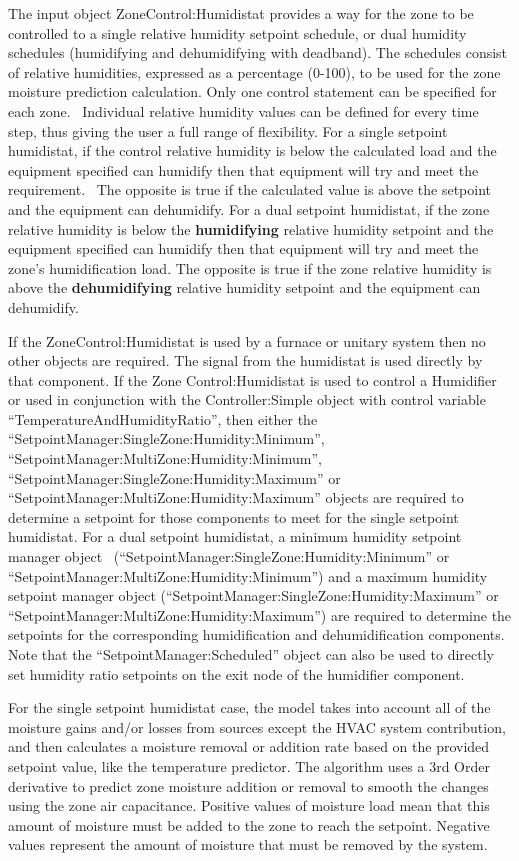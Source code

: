 The input object ZoneControl:Humidistat provides a way for the zone to be controlled to a single relative humidity setpoint schedule, or dual humidity schedules (humidifying and dehumidifying with deadband). The schedules consist of relative humidities, expressed as a percentage (0-100), to be used for the zone moisture prediction calculation. Only one control statement can be specified for each zone.~ Individual relative humidity values can be defined for every time step, thus giving the user a full range of flexibility. For a single setpoint humidistat, if the control relative humidity is below the calculated load and the equipment specified can humidify then that equipment will try and meet the requirement.~ The opposite is true if the calculated value is above the setpoint and the equipment can dehumidify. For a dual setpoint humidistat, if the zone relative humidity is below the \textbf{humidifying} relative humidity setpoint and the equipment specified can humidify then that equipment will try and meet the zone's humidification load. The opposite is true if the zone relative humidity is above the \textbf{dehumidifying} relative humidity setpoint and the equipment can dehumidify.

If the ZoneControl:Humidistat is used by a furnace or unitary system then no other objects are required. The signal from the humidistat is used directly by that component. If the Zone Control:Humidistat is used to control a Humidifier or used in conjunction with the Controller:Simple object with control variable ``TemperatureAndHumidityRatio'', then either the ``SetpointManager:SingleZone:Humidity:Minimum'', ``SetpointManager:MultiZone:Humidity:Minimum'',~~ ``SetpointManager:SingleZone:Humidity:Maximum'' or ``SetpointManager:MultiZone:Humidity:Maximum'' objects are required to determine a setpoint for those components to meet for the single setpoint humidistat. For a dual setpoint humidistat, a minimum humidity setpoint manager object~ (``SetpointManager:SingleZone:Humidity:Minimum'' or ``SetpointManager:MultiZone:Humidity:Minimum'') and a maximum humidity setpoint manager object (``SetpointManager:SingleZone:Humidity:Maximum'' or ``SetpointManager:MultiZone:Humidity:Maximum'') are required to determine the setpoints for the corresponding humidification and dehumidification components. Note that the ``SetpointManager:Scheduled'' object can also be used to directly set humidity ratio setpoints on the exit node of the humidifier component.

For the single setpoint humidistat case, the model takes into account all of the moisture gains and/or losses from sources except the HVAC system contribution, and then calculates a moisture removal or addition rate based on the provided setpoint value, like the temperature predictor. The algorithm uses a 3rd Order derivative to predict zone moisture addition or removal to smooth the changes using the zone air capacitance. Positive values of moisture load mean that this amount of moisture must be added to the zone to reach the setpoint. Negative values represent the amount of moisture that must be removed by the system.

